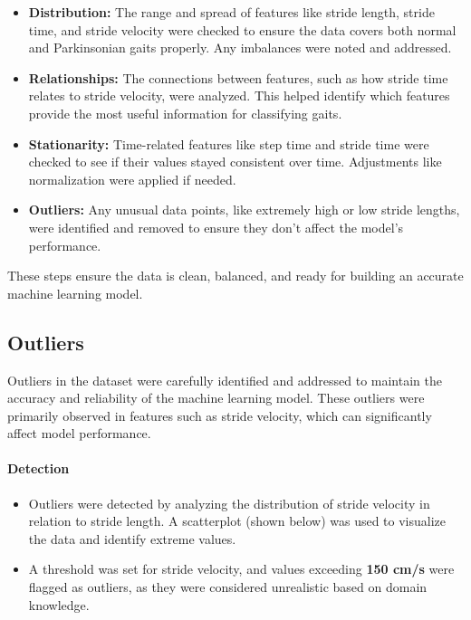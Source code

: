 \begin{itemize}
	\item \textbf{Distribution:}
	The range and spread of features like stride length, stride time, and stride velocity were checked to ensure the data covers both normal and Parkinsonian gaits properly. Any imbalances were noted and addressed.
	
	\item \textbf{Relationships:}
	The connections between features, such as how stride time relates to stride velocity, were analyzed. This helped identify which features provide the most useful information for classifying gaits.
	
	\item \textbf{Stationarity:}
	Time-related features like step time and stride time were checked to see if their values stayed consistent over time. Adjustments like normalization were applied if needed.
	
	\item \textbf{Outliers:}
	Any unusual data points, like extremely high or low stride lengths, were identified and removed to ensure they don’t affect the model’s performance.
\end{itemize}

These steps ensure the data is clean, balanced, and ready for building an accurate machine learning model.


\subsection{Outliers}

Outliers in the dataset were carefully identified and addressed to maintain the accuracy and reliability of the machine learning model. These outliers were primarily observed in features such as stride velocity, which can significantly affect model performance.

\paragraph{Detection}
\begin{itemize}
	\item Outliers were detected by analyzing the distribution of stride velocity in relation to stride length. A scatterplot (shown below) was used to visualize the data and identify extreme values.
	\item A threshold was set for stride velocity, and values exceeding \textbf{150 cm/s} were flagged as outliers, as they were considered unrealistic based on domain knowledge.\cite{perry2010gait}
\end{itemize}

